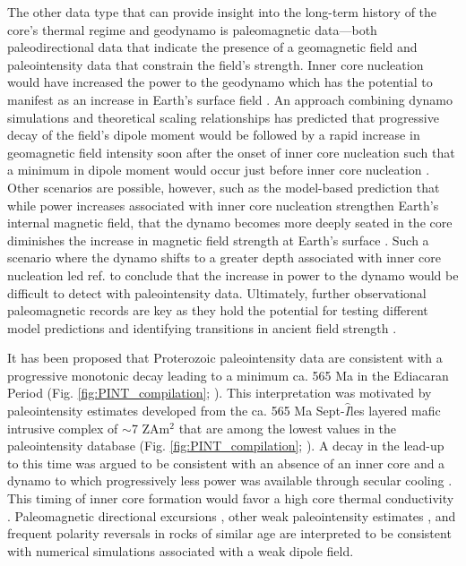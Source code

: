 \documentclass[9pt,twocolumn,twoside,lineno]{pnas-new}
\begin{document}
The other data type that can provide insight into the long-term history of the core's thermal regime and geodynamo is paleomagnetic data---both paleodirectional data that indicate the presence of a geomagnetic field and paleointensity data that constrain the field's strength. Inner core nucleation would have increased the power to the geodynamo which has the potential to manifest as an increase in Earth's surface field \cite{Davies2021a}. An approach combining dynamo simulations and theoretical scaling relationships has predicted that progressive decay of the field's dipole moment would be followed by a rapid increase in geomagnetic field intensity soon after the onset of inner core nucleation such that a minimum in dipole moment would occur just before inner core nucleation \cite{Davies2021a}. Other scenarios are possible, however, such as the model-based prediction that while power increases associated with inner core nucleation strengthen Earth's internal magnetic field, that the dynamo becomes more deeply seated in the core diminishes the increase in magnetic field strength at Earth's surface \cite{Aubert2009a, Landeau2017a}. Such a scenario where the dynamo shifts to a greater depth associated with inner core nucleation led ref. \citealp{Aubert2009a} to conclude that the increase in power to the dynamo would be difficult to detect with paleointensity data. Ultimately, further observational paleomagnetic records are key as they hold the potential for testing different model predictions and identifying transitions in ancient field strength \cite{Biggin2015a, Bono2019a}.

It has been proposed that Proterozoic paleointensity data are consistent with a progressive monotonic decay leading to a minimum ca. 565 Ma in the Ediacaran Period (Fig. \ref{fig:PINT_compilation}; \citealp{Bono2019a}). This interpretation was motivated by paleointensity estimates developed from the ca. 565 Ma Sept-$\hat{I}$les layered mafic intrusive complex of $\sim$7 ZAm$^2$ that are among the lowest values in the paleointensity database (Fig. \ref{fig:PINT_compilation}; \citealp{Bono2019a}). A decay in the lead-up to this time was argued to be consistent with an absence of an inner core and a dynamo to which progressively less power was available through secular cooling \cite{Bono2019a, Davies2021a}. This timing of inner core formation would favor a high core thermal conductivity \cite[e.g.][]{Ohta2016a}. Paleomagnetic directional excursions \cite{Halls2015a}, other weak paleointensity estimates \cite{Thallner2021b}, and frequent polarity reversals \cite{Kodama2021a} in rocks of similar age are interpreted to be consistent with numerical simulations \cite{Driscoll2016a} associated with a weak dipole field. 
\end{document}
